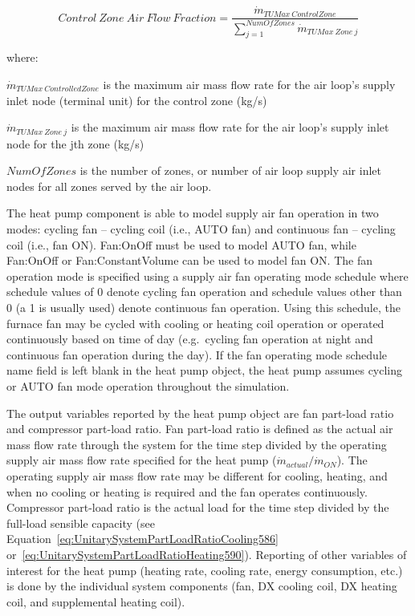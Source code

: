 \begin{equation}
Control~Zone~Air~Flow~Fraction = \frac{{{{\dot m}_{TUMax~ControlZone}}}}{{\sum\limits_{j = 1}^{NumOfZones} {{{\dot m}_{TUMax~Zone~j}}} }}
\end{equation}

where:

\({\dot m_{TUMax~ControlledZone}}\) is the maximum air mass flow rate for the air loop's supply inlet node (terminal unit) for the control zone (kg/s)

\({\dot m_{TUMax~Zone~j}}\) is the maximum air mass flow rate for the air loop's supply inlet node for the jth zone (kg/s)

\(NumOfZones\) is the number of zones, or number of air loop supply air inlet nodes for all zones served by the air loop.

The heat pump component is able to model supply air fan operation in two modes: cycling fan -- cycling coil (i.e., AUTO fan) and continuous fan -- cycling coil (i.e., fan ON). Fan:OnOff must be used to model AUTO fan, while Fan:OnOff or Fan:ConstantVolume can be used to model fan ON. The fan operation mode is specified using a supply air fan operating mode schedule where schedule values of 0 denote cycling fan operation and schedule values other than 0 (a 1 is usually used) denote continuous fan operation. Using this schedule, the furnace fan may be cycled with cooling or heating coil operation or operated continuously based on time of day (e.g.~cycling fan operation at night and continuous fan operation during the day). If the fan operating mode schedule name field is left blank in the heat pump object, the heat pump assumes cycling or AUTO fan mode operation throughout the simulation.

The output variables reported by the heat pump object are fan part-load ratio and compressor part-load ratio. Fan part-load ratio is defined as the actual air mass flow rate through the system for the time step divided by the operating supply air mass flow rate specified for the heat pump (\({\dot{m}_{actual}} / {\dot{m}_{ON}}\)). The operating supply air mass flow rate may be different for cooling, heating, and when no cooling or heating is required and the fan operates continuously. Compressor part-load ratio is the actual load for the time step divided by the full-load sensible capacity (see Equation~\ref{eq:UnitarySystemPartLoadRatioCooling586} or~\ref{eq:UnitarySystemPartLoadRatioHeating590}). Reporting of other variables of interest for the heat pump (heating rate, cooling rate, energy consumption, etc.) is done by the individual system components (fan, DX cooling coil, DX heating coil, and supplemental heating coil).

